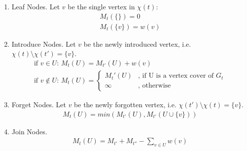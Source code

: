 \documentclass{article}
\begin{document}
\begin{enumerate}
    \item Leaf Nodes. Let $v$ be the single vertex in $\chi(t)$:
    \begin{gather*}
        M_t(\{\}) = 0 \\
        M_t(\{v\}) = w(v)
    \end{gather*}
    \item Introduce Nodes. Let $v$ be the newly introduced vertex, i.e. $\chi(t) \setminus \chi(t') = \{v\}$.
    \begin{gather*}
        \text{if $v \in U$: } M_t(U) = M_{t'}(U) + w(v)\\
        \text{if $v \notin U$: } M_t(U) =
        \begin{cases}
            M_t'(U) & \text{, if U is a vertex cover of $G_t$} \\
            \infty & \text{, otherwise}
        \end{cases}
    \end{gather*}
    \item Forget Nodes. Let $v$ be the newly forgotten vertex, i.e. $\chi(t') \setminus \chi(t) = \{v\}$.
    \begin{gather*}
        M_t(U) = min(M_{t'}(U), M_{t'}(U \cup \{v\}))
    \end{gather*}
    \item Join Nodes.
    \begin{gather*}
        M_t(U) = M_{t'} + M_{t''} - \sum_{v \in U} w(v)
    \end{gather*}
\end{enumerate}
\end{document}
